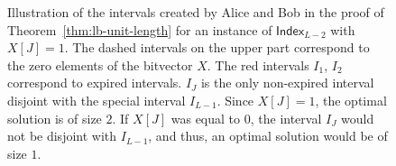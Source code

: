 \documentclass{article}
\begin{document}
\begin{figure}[h]
    \centering
    \caption{Illustration of the intervals created by Alice and Bob in the proof of Theorem~\ref{thm:lb-unit-length} for an instance of $\textsf{Index}_{L-2}$ with $X[J] = 1$. The dashed intervals on the upper part correspond to the zero elements of the bitvector $X$. The red intervals $I_1$, $I_2$ correspond to expired intervals. $I_J$ is the only non-expired interval disjoint with the special interval $I_{L-1}$. Since $X[J] = 1$, the optimal solution is of size $2$. If $X[J]$ was equal to $0$, the interval $I_J$ would not be disjoint with $I_{L-1}$, and thus, an optimal solution would be of size $1$.}
    \label{fig:lb-unit-length-proof}
\end{figure}
\end{document}
